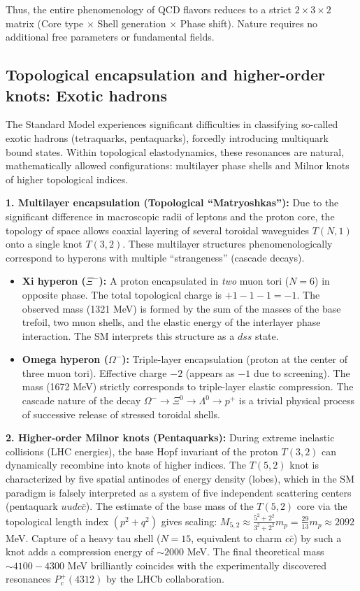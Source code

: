 \documentclass[11pt,a4paper]{article}
\begin{document}
Thus, the entire phenomenology of QCD flavors reduces to a strict $2 \times 3 \times 2$ matrix (Core type $\times$ Shell generation $\times$ Phase shift). Nature requires no additional free parameters or fundamental fields.

\subsection{Topological encapsulation and higher-order knots: Exotic hadrons}
The Standard Model experiences significant difficulties in classifying so-called exotic hadrons (tetraquarks, pentaquarks), forcedly introducing multiquark bound states. Within topological elastodynamics, these resonances are natural, mathematically allowed configurations: multilayer phase shells and Milnor knots of higher topological indices.

\textbf{1. Multilayer encapsulation (Topological ``Matryoshkas''):}
Due to the significant difference in macroscopic radii of leptons and the proton core, the topology of space allows coaxial layering of several toroidal waveguides $T(N,1)$ onto a single knot $T(3,2)$. These multilayer structures phenomenologically correspond to hyperons with multiple ``strangeness'' (cascade decays).
\begin{itemize}
    \item \textbf{Xi hyperon ($\Xi^-$):} A proton encapsulated in \textit{two} muon tori ($N=6$) in opposite phase. The total topological charge is $+1 - 1 - 1 = -1$. The observed mass (1321 MeV) is formed by the sum of the masses of the base trefoil, two muon shells, and the elastic energy of the interlayer phase interaction. The SM interprets this structure as a $dss$ state.
    \item \textbf{Omega hyperon ($\Omega^-$):} Triple-layer encapsulation (proton at the center of three muon tori). Effective charge $-2$ (appears as $-1$ due to screening). The mass (1672 MeV) strictly corresponds to triple-layer elastic compression. The cascade nature of the decay $\Omega^- \to \Xi^0 \to \Lambda^0 \to p^+$ is a trivial physical process of successive release of stressed toroidal shells.
\end{itemize}

\textbf{2. Higher-order Milnor knots (Pentaquarks):}
During extreme inelastic collisions (LHC energies), the base Hopf invariant of the proton $T(3,2)$ can dynamically recombine into knots of higher indices. The $T(5,2)$ knot is characterized by five spatial antinodes of energy density (lobes), which in the SM paradigm is falsely interpreted as a system of five independent scattering centers (pentaquark $uudc\bar{c}$). 
The estimate of the base mass of the $T(5,2)$ core via the topological length index $(p^2+q^2)$ gives scaling: $M_{5,2} \approx \frac{5^2+2^2}{3^2+2^2} m_p = \frac{29}{13} m_p \approx 2092$ MeV. Capture of a heavy tau shell ($N=15$, equivalent to charm $c\bar{c}$) by such a knot adds a compression energy of $\sim 2000$ MeV. The final theoretical mass $\sim 4100-4300$ MeV brilliantly coincides with the experimentally discovered resonances $P_c^+(4312)$ by the LHCb collaboration.
\end{document}
